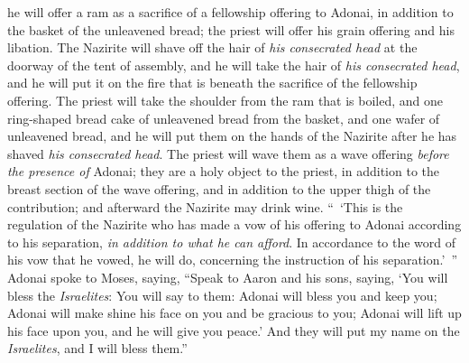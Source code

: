 \begin{biblechapter}
\verse he will offer a ram as a sacrifice of a fellowship offering to Adonai, in addition to the basket of the unleavened bread; the priest will offer his grain offering and his libation.
\verse The Nazirite will shave off the hair of \textit{his consecrated head} at the doorway of the tent of assembly, and he will take the hair of \textit{his consecrated head}, and he will put it on the fire that is beneath the sacrifice of the fellowship offering.
\verse The priest will take the shoulder from the ram that is boiled, and one ring-shaped bread cake of unleavened bread from the basket, and one wafer of unleavened bread, and he will put them on the hands of the Nazirite after he has shaved \textit{his consecrated head}.
\verse The priest will wave them as a wave offering \textit{before the presence of} Adonai; they are a holy object to the priest, in addition to the breast section of the wave offering, and in addition to the upper thigh of the contribution; and afterward the Nazirite may drink wine.
\verse “ ‘This is the regulation of the Nazirite who has made a vow of his offering to Adonai according to his separation, \textit{in addition to what he can afford}. In accordance to the word of his vow that he vowed, he will do, concerning the instruction of his separation.’ ”
 Adonai spoke to Moses, saying,
\verse “Speak to Aaron and his sons, saying, ‘You will bless the \textit{Israelites}: You will say to them:
\verse Adonai will bless you 
and keep you;
\verse Adonai will make shine his face on you 
and be gracious to you;
\verse Adonai will lift up his face upon you, 
and he will give you peace.’
\verse And they will put my name on the \textit{Israelites}, and I will bless them.”
\end{biblechapter}

